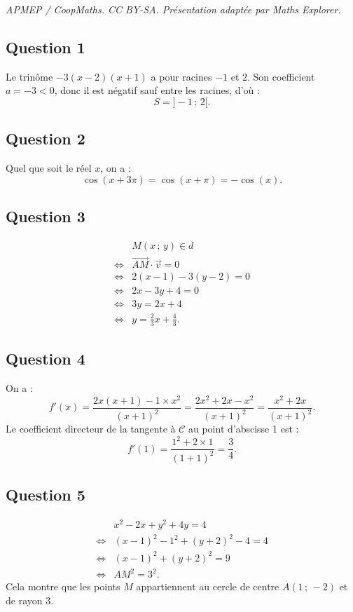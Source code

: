 \documentclass[10pt]{article}
\begin{document}
\noindent\textit{APMEP / CoopMaths. CC BY-SA. Présentation adaptée par Maths Explorer.}\par\medskip
\subsection*{Question 1}

Le trinôme \(-3(x - 2)(x + 1)\) a pour racines \(-1\) et \(2\). Son coefficient \(a = -3 < 0\), donc il est négatif sauf entre les racines, d'où :
\[
S = ]-1 \,;\, 2[.
\]

\subsection*{Question 2}

Quel que soit le réel \(x\), on a :
\[
\cos(x + 3\pi) = \cos(x + \pi) = -\cos(x).
\]

\subsection*{Question 3}

\begin{align*}
&M(x\,;\,y) \in \textit{d} \\
\iff &\overrightarrow{AM} \cdot \vec{v} = 0 \\
\iff &2(x - 1) - 3(y - 2) = 0 \\
\iff &2x - 3y + 4 = 0 \\
\iff &3y = 2x + 4 \\
\iff &y = \frac{2}{3}x + \frac{4}{3}.
\end{align*}

\subsection*{Question 4}

On a :
\[
f'(x) = \frac{2x(x + 1) - 1 \times x^2}{(x + 1)^2} = \frac{2x^2 + 2x - x^2}{(x + 1)^2} = \frac{x^2 + 2x}{(x + 1)^2}.
\]
Le coefficient directeur de la tangente à \(\mathcal{C}\) au point d'abscisse 1 est :
\[
f'(1) = \frac{1^2 + 2 \times 1}{(1 + 1)^2} = \frac{3}{4}.
\]

\subsection*{Question 5}

\begin{align*}
&x^2 - 2x + y^2 + 4y = 4 \\
\iff &(x - 1)^2 - 1^2 + (y + 2)^2 - 4 = 4 \\
\iff &(x - 1)^2 + (y + 2)^2 = 9 \\
\iff &AM^2 = 3^2.
\end{align*}
Cela montre que les points \( M \) appartiennent au cercle de centre \( A(1\,;\,-2) \) et de rayon 3.
\end{document}
